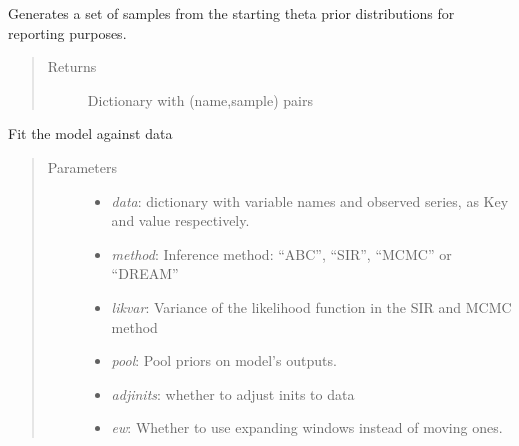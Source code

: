\documentclass[a4paper,10pt,english]{sphinxmanual}
\begin{document}
\begin{fulllineitems}
\begin{fulllineitems}
\end{fulllineitems}


\begin{fulllineitems}
\label{BIP.Bayes:BIP.Bayes.Melding.FitModel.prior_sample}
Generates a set of samples from the starting theta prior distributions
for reporting purposes.
\begin{quote}\begin{description}
\item[{Returns}] \leavevmode
Dictionary with (name,sample) pairs

\end{description}\end{quote}

\end{fulllineitems}


\begin{fulllineitems}
\label{BIP.Bayes:BIP.Bayes.Melding.FitModel.run}
Fit the model against data
\begin{quote}\begin{description}
\item[{Parameters}] \leavevmode\begin{itemize}
\item {} 
\emph{data}: dictionary with variable names and observed series, as Key and value respectively.

\item {} 
\emph{method}: Inference method: ``ABC'', ``SIR'', ``MCMC'' or ``DREAM''

\item {} 
\emph{likvar}: Variance of the likelihood function in the SIR and MCMC method

\item {} 
\emph{pool}: Pool priors on model's outputs.

\item {} 
\emph{adjinits}: whether to adjust inits to data

\item {} 
\emph{ew}: Whether to use expanding windows instead of moving ones.


\end{itemize}
\end{description}
\end{quote}
\end{fulllineitems}
\end{fulllineitems}
\end{document}
